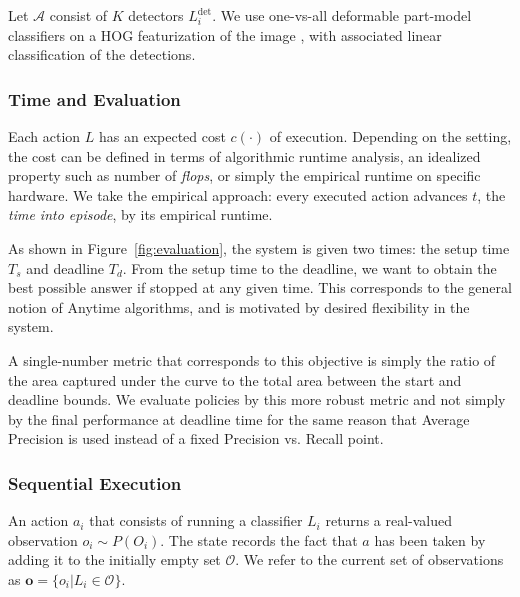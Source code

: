 Let $\mathcal{A}$ consist of $K$ detectors $L^\text{det}_i$.
We use one-vs-all deformable part-model classifiers on a HOG featurization of the image \cite{Felzenszwalb2010a}, with associated linear classification of the detections.


\subsubsection{Time and Evaluation}
Each action $L$ has an expected cost $c(\cdot)$ of execution.
Depending on the setting, the cost can be defined in terms of algorithmic runtime analysis, an idealized property such as number of \emph{flops}, or simply the empirical runtime on specific hardware.
We take the empirical approach: every executed action advances $t$, the \emph{time into episode}, by its empirical runtime.

As shown in Figure~\ref{fig:evaluation}, the system is given two times: the setup time $T_s$ and deadline $T_d$.
From the setup time to the deadline, we want to obtain the best possible answer if stopped at any given time.
This corresponds to the general notion of Anytime algorithms, and is motivated by desired flexibility in the system.

A single-number metric that corresponds to this objective is simply the ratio of the area captured under the curve to the total area between the start and deadline bounds.
We evaluate policies by this more robust metric and not simply by the final performance at deadline time for the same reason that Average Precision is used instead of a fixed Precision vs. Recall point.

\subsubsection{Sequential Execution}
An action $a_i$ that consists of running a classifier $L_i$ returns a real-valued observation $o_i \sim P(O_i)$.
The state records the fact that $a$ has been taken by adding it to the initially empty set $\mathcal{O}$.
We refer to the current set of observations as $\mathbf{o} = \{o_i | L_i \in \mathcal{O}\}$.

